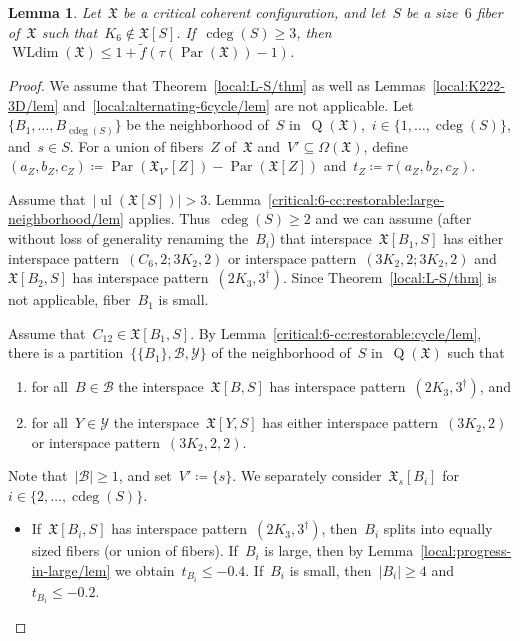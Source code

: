 \documentclass[english,a4paper]{article}
\theoremstyle{plain}
\newtheorem{lemma}      [theorem]{Lemma}
\theoremstyle{definition}
\newcommand{\abs}[1]{| #1 |}
\newcommand{\coherentConfig}{\ensuremath{\mathfrak{X}}}
\newcommand{\interspace}[2]{\ensuremath{\coherentConfig[#1,#2]}}
\newcommand{\inducedCC}[1]{\ensuremath{\coherentConfig[#1]}}
\DeclareMathOperator*{\ul}{ul}
\newcommand{\vertices}{\ensuremath{\Omega}}
\DeclareMathOperator*{\WLdim}{WLdim}
\newcommand{\wldim}[1]{\ensuremath{\WLdim\left(#1\right)}}
\DeclareMathOperator*{\Quotient}{Q}
\newcommand{\quotientGraph}[1]{\ensuremath{\Quotient(#1)}}
\DeclareMathOperator{\ColorDeg}{cdeg}
\newcommand{\colorDeg}[1]{\ensuremath{\ColorDeg\left(#1\right)}}
\newcommand{\f}{f}
\DeclareMathOperator{\parameters}{Par}
\newcommand{\ipsixMatching}             {\ensuremath{(\disjointCliques{3}{2},2)}}
\newcommand{\ipsixMatchingTwice}        {\ensuremath{(\disjointCliques{3}{2},2,2)}}
\newcommand{\ipsixMatchingMatching}     {\ensuremath{(\disjointCliques{3}{2},2;\disjointCliques{3}{2},2)}}
\newcommand{\ipsixMatchingAndCycle}     {\ensuremath{(\cycle{6},2;\disjointCliques{3}{2},2)}}
\newcommand{\ipsixTriangle}               {\ensuremath{(\disjointCliques{2}{3},3^\dag)}}
\newcommand{\clique}[1]{\ensuremath{K_{#1}}}
\newcommand{\cycle}[1]{\ensuremath{C_{#1}}}
\newcommand{\disjointCliques}[2]{\ensuremath{#1 \clique{#2}}}
\begin{document}
\begin{lemma}
\label{local:6cc:3neighbors/lem}
    Let~$\coherentConfig$ be a critical coherent configuration, and let~$S$ be a size~$6$ fiber of~$\coherentConfig$  such that~$\clique{6} \notin\inducedCC{S}$.
    If~$\colorDeg{S} \geq 3$, then~$\wldim{\coherentConfig} \leq 1 + \widetilde{\f}( \tau(\parameters(\coherentConfig)) - 1  )$.
\end{lemma}
\begin{proof}
    We assume that Theorem~\ref{local:L-S/thm} as well as Lemmas~\ref{local:K222-3D/lem} and~\ref{local:alternating-6cycle/lem} are not applicable.
    Let~$\{B_1,\dots,B_{\colorDeg{S}}\}$ be the neighborhood of~$S$ in~$\quotientGraph{\coherentConfig}$,~$i \in \{1,\dots,\colorDeg{S}\}$, and~$s \in S$.
    For a union of fibers~$Z$ of~$\coherentConfig$  and~$V' \subseteq \vertices(\coherentConfig)$, define~$(a_Z,b_Z,c_Z) \coloneqq \parameters(\coherentConfig_{V'}[Z]) - \parameters(\coherentConfig[Z])$ and~$t_Z \coloneqq \tau(a_Z,b_Z,c_Z)$.

    Assume that~$\abs{\ul(\inducedCC{S})} > 3$.
    Lemma~\ref{critical:6-cc:restorable:large-neighborhood/lem} applies. Thus~$\colorDeg{S} \geq 2$ and we can assume (after without loss of generality renaming the~$B_i$) that interspace~$\interspace{B_1}{S}$ has either interspace pattern~$\ipsixMatchingAndCycle$ or interspace pattern~$\ipsixMatchingMatching$ and~$\interspace{B_2}{S}$ has interspace pattern~$\ipsixTriangle$.
    Since Theorem~\ref{local:L-S/thm} is not applicable, fiber~$B_1$ is small.

    Assume that~$\cycle{12} \in \interspace{B_1}{S}$.
    By Lemma~\ref{critical:6-cc:restorable:cycle/lem}, there is a partition~$\{\{B_1\},\mathcal{B}, \mathcal{Y}\}$ of the neighborhood of~$S$ in~$\quotientGraph{\coherentConfig}$ such that
    \begin{enumerate}
        \item for all~$B \in \mathcal{B}$ the interspace~$\interspace{B}{S}$ has interspace pattern~$\ipsixTriangle$, and
        \item for all~$Y \in \mathcal{Y}$ the interspace~$\interspace{Y}{S}$ has either interspace pattern~$\ipsixMatching$ or interspace pattern~$\ipsixMatchingTwice$.
    \end{enumerate}
    Note that~$|\mathcal{B}| \geq 1$, and set~$V' \coloneqq \{s\}$.
    We separately consider~$\coherentConfig_s[B_i]$ for~$i \in \{2,\dots,\colorDeg{S}\}$.
    \begin{itemize}
        \item
        If~$\interspace{B_i}{S}$ has interspace pattern~$\ipsixTriangle$, then~$B_i$ splits into equally sized fibers (or union of fibers).
        If~$B_i$ is large, then by Lemma~\ref{local:progress-in-large/lem} we obtain~$t_{B_i} \leq -0.4$.
        If~$B_i$ is small, then~$|B_i| \geq 4$ and~$t_{B_i} \leq -0.2$.


\end{itemize}
\end{proof}
\end{document}
